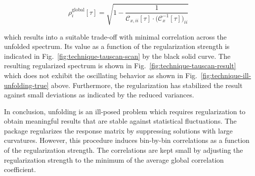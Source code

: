 \begin{equation}
\rho^\mathrm{global}_{ i}[\tau]=\sqrt{1-\frac{1}{\mathcal{C}_{x,ii}[\tau]\cdot\big(\mathcal{C}_{x}^{-1}[\tau]\big)_{ii}}}\label{eq:technique-global-correlation}
\end{equation}

which results into a suitable trade-off with minimal correlation across the unfolded spectrum. Its value as a function of the regularization strength is indicated in Fig.~\ref{fig:technique-tauscan-scan} by the black solid curve. The resulting regularized spectrum is shown in Fig.~\ref{fig:technique-tauscan-result} which does not exhibit the oscillating behavior as shown in Fig.~\ref{fig:technique-ill-unfolding-true} above. Furthermore, the regularization has stabilized the result against small deviations as indicated by the reduced variances.



In conclusion, unfolding is an ill-posed problem which requires regularization to obtain meaningful results that are stable against statistical fluctuations. The \TUNFOLD package regularizes the response matrix by suppressing solutions with large curvatures. However, this procedure induces bin-by-bin correlations as a function of the regularization strength. The correlations are kept small by adjusting the regularization strength to the minimum of the average global correlation coefficient.

